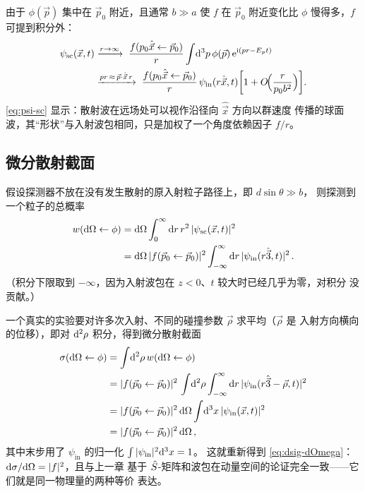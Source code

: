 由于 $\phi(\vec p)$ 集中在 $\vec p_0$ 附近，且通常 $b\gg a$ 使 $f$ 在 $\vec p_0$
附近变化比 $\phi$ 慢得多，$f$ 可提到积分外：
\begin{align}
  \psi_{\text{sc}}(\vec x,t)
  &\xrightarrow{r\to\infty}\;
  \frac{f(p_0\hat{\vec x}\leftarrow \vec p_0)}{r}
  \int\!\mathrm{d}^3 p\,\phi(\vec p)\,\mathrm{e}^{\mathrm{i}(p r - E_p t)}\nonumber\\
  &\xrightarrow{p r\,\approx\, \vec p\cdot \hat{\vec x}\, r}\;
  \frac{f(p_0\hat{\vec x}\leftarrow \vec p_0)}{r}\,
  \psi_{\text{in}}(r\hat{\vec x},t)\!\left[1+O\!\Big(\frac{r}{p_0 b^2}\Big)\right]\!.
  \label{eq:psi-sc}
\end{align}
\eqref{eq:psi-sc} 显示：散射波在远场处可以视作沿径向 $\hat{\vec x}$ 方向以群速度
传播的球面波，其``形状''与入射波包相同，只是加权了一个角度依赖因子 $f/r$。

\subsection{微分散射截面}

假设探测器不放在没有发生散射的原入射粒子路径上，即 $d\sin\theta\gg b$，
则探测到一个粒子的总概率
\begin{align}
  w(\mathrm{d}\Omega\leftarrow\phi)
  &= \mathrm{d}\Omega\int_0^\infty\mathrm{d} r\,r^2\,|\psi_{\text{sc}}(\vec x,t)|^2\nonumber\\
  &= \mathrm{d}\Omega\,|f(\vec p_0\leftarrow\vec p_0)|^2
     \int_{-\infty}^{\infty}\mathrm{d} r\,|\psi_{\text{in}}(r\hat{\vec 3},t)|^2\,.
  \label{eq:w}
\end{align}
（积分下限取到 $-\infty$，因为入射波包在 $z<0$、$t$ 较大时已经几乎为零，对积分
没贡献。）

一个真实的实验要对许多次入射、不同的碰撞参数 $\vec\rho$ 求平均（$\vec\rho$ 是
入射方向横向的位移），即对 $\mathrm{d}^2\rho$ 积分，得到微分散射截面
\begin{align}
  \sigma(\mathrm{d}\Omega\leftarrow\phi)
  &= \int\!\mathrm{d}^2\rho\,w(\mathrm{d}\Omega\leftarrow\phi)\nonumber\\
  &= |f(\vec p_0\leftarrow\vec p_0)|^2\,
     \int\!\mathrm{d}^2\rho\int_{-\infty}^{\infty}\mathrm{d} r\,|\psi_{\text{in}}(r\hat{\vec 3}-\vec\rho,t)|^2\nonumber\\
  &= |f(\vec p_0\leftarrow\vec p_0)|^2\,\mathrm{d}\Omega\int\!\mathrm{d}^3 x\,|\psi_{\text{in}}(\vec x,t)|^2\nonumber\\
  &= |f(\vec p_0\leftarrow\vec p_0)|^2\,\mathrm{d}\Omega\,,
  \label{eq:dsig-final}
\end{align}
其中末步用了 $\psi_{\text{in}}$ 的归一化 $\int|\psi_{\text{in}}|^2\mathrm{d}^3x=1$。
这就重新得到 \eqref{eq:dsig-dOmega}：$\mathrm{d}\sigma/\mathrm{d}\Omega = |f|^2$，且与上一章
基于 $\hat{S}$-矩阵和波包在动量空间的论证完全一致——它们就是同一物理量的两种等价
表达。

